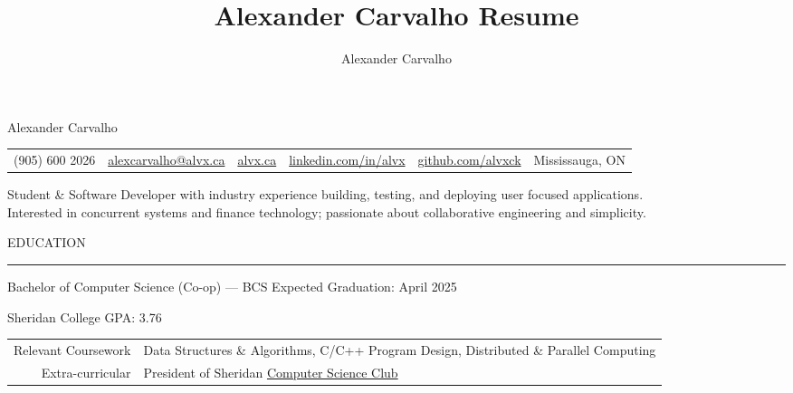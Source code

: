 \documentclass[9pt]{extarticle}
\title{Alexander Carvalho Resume}
\author{Alexander Carvalho}
\begin{document}
\color{regtextgray}


\begin{center}
	{\Huge \textcolor{imptextblack}{Alexander Carvalho}}

	\begin{tabular}{ c c c c c c }
		\textcolor{imptextblack}{(905) 600 2026} & 
		\href{mailto:alexcarvalho@alvx.ca}{alexcarvalho@alvx.ca} & 
		\href{alvx.ca}{alvx.ca} & 
		\href{https://www.linkedin.com/in/alvx}{linkedin.com/in/alvx} & 
		\href{https://www.github.com/alvxck}{github.com/alvxck} & 
		\textcolor{imptextblack}{Mississauga, ON}
	\end{tabular}

	\vspace{5pt}	

	Student \& Software Developer with industry experience building, testing, and deploying user focused applications.  \\
	Interested in concurrent systems and finance technology; passionate about collaborative engineering and simplicity.
\end{center}


\begin{adjustwidth}{4pt}{4pt} EDUCATION \end{adjustwidth}
\rule[8pt]{\linewidth}{0.4pt}

\begin{adjustwidth}{14pt}{14pt}
	\vspace{-10pt}	

	\textcolor{imptextblack}{Bachelor of Computer Science (Co-op) — BCS} \hfill Expected Graduation: April 2025
	
	Sheridan College \hfill GPA: 3.76
	
	\begin{tabular}{ r l }
	 	\textcolor{imptextblack}{Relevant Coursework} & Data Structures \& Algorithms, C/C++ Program Design, Distributed \& Parallel Computing \\ 
		\textcolor{imptextblack}{Extra-curricular} & President of Sheridan \href{https://sheridancollege.campuslabs.ca/engage/organization/mobilecomputingclub}{Computer Science Club} \\
	\end{tabular}
\end{adjustwidth}
\end{document}

